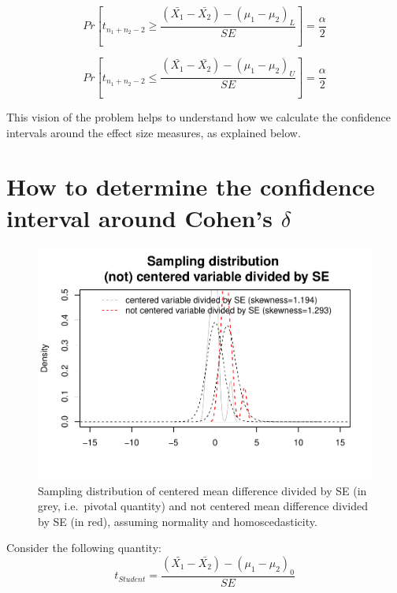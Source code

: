 \documentclass[man,floatsintext]{apa6}
\begin{document}
\begin{equation} 
Pr[t_{n_1+n_2-2} \geq \frac{(\bar{X_1}-\bar{X_2})-(\mu_1-\mu_2)_L}{SE}]= \frac{\alpha}{2}
\label{eq:plausiblelimit1}
\end{equation}

\begin{equation} 
Pr[t_{n_1+n_2-2} \leq \frac{(\bar{X_1}-\bar{X_2})-(\mu_1-\mu_2)_U}{SE}]= \frac{\alpha}{2}
\label{eq:plausiblelimit2}
\end{equation}

This vision of the problem helps to understand how we calculate the confidence intervals around the effect size measures, as explained below.

\hypertarget{how-to-determine-the-confidence-interval-around-cohens-delta}{%
\section{\texorpdfstring{How to determine the confidence interval around Cohen's \(\delta\)}{How to determine the confidence interval around Cohen's \textbackslash delta}}\label{how-to-determine-the-confidence-interval-around-cohens-delta}}

\begin{figure}
\centering
\includegraphics{CI-Reminder_files/figure-latex/SAMPLMEANDIFF3-1.pdf}
\caption{\label{fig:SAMPLMEANDIFF3}Sampling distribution of centered mean difference divided by SE (in grey, i.e.~pivotal quantity) and not centered mean difference divided by SE (in red), assuming normality and homoscedasticity.}
\end{figure}

Consider the following quantity:
\begin{equation} 
t_{Student}=\frac{(\bar{X_1}-\bar{X_2})-(\mu_1-\mu_2)_0}{SE}
\label{eq:plausiblelimit2}
\end{equation}
\end{document}

